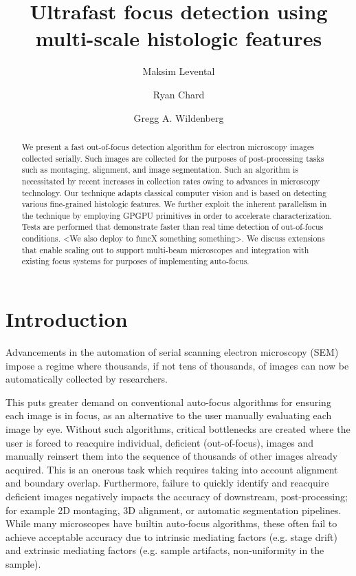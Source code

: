 \documentclass[sigconf,nonacm]{acmart}
\newcommand{\todo}[1]{}
\newcommand{\todo}[1]{{\textcolor{blue}{ TODO: #1 }}}
\begin{document}
\title{Ultrafast focus detection using multi-scale histologic features}


\author{Maksim Levental}
\author{Ryan Chard}
\author{Gregg A. Wildenberg}

\begin{abstract}
    We present a fast out-of-focus detection algorithm for electron microscopy images collected serially. 
    Such images are collected for the purposes of post-processing tasks such as montaging, alignment, and image segmentation. 
    Such an algorithm is necessitated by recent increases in collection rates owing to advances in microscopy technology. 
    Our technique adapts classical computer vision and is based on detecting various fine-grained histologic features. 
    We further exploit the inherent parallelism in the technique by employing GPGPU primitives in order to accelerate characterization. 
    Tests are performed that demonstrate faster than real time detection of out-of-focus conditions. 
    <We also deploy to funcX something something>.
    We discuss extensions that enable scaling out to support multi-beam microscopes and integration with existing focus systems for purposes of implementing auto-focus.

\end{abstract}

\maketitle

\section{Introduction}\label{sec:intro}

Advancements in the automation of serial scanning electron microscopy (SEM)  impose a regime where thousands, if not tens of thousands, of images can now be automatically collected by researchers.
\todo{<bio use cases>}
This puts greater demand on conventional auto-focus algorithms for ensuring each image is in focus, as an alternative to the user manually evaluating each image by eye. 
Without such algorithms, critical bottlenecks are created where the user is forced to reacquire individual, deficient (out-of-focus), images and manually reinsert them into the sequence of thousands of other images already acquired.
This is an onerous task which requires taking into account alignment and boundary overlap. 
Furthermore, failure to quickly identify and reacquire deficient images negatively impacts the accuracy of downstream, post-processing; for example 2D montaging, 3D alignment, or automatic segmentation pipelines. 
While many microscopes have builtin auto-focus algorithms, these often fail to achieve acceptable accuracy due to intrinsic mediating factors (e.g. stage drift) and extrinsic mediating factors (e.g. sample artifacts, non-uniformity in the sample). 
\end{document}
